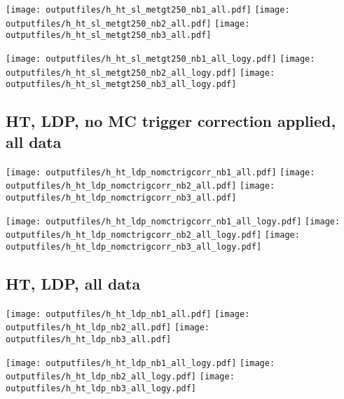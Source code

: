 \documentclass[11pt]{article}
\begin{document}
    \noindent
     \texttt{[image: outputfiles/h\_ht\_sl\_metgt250\_nb1\_all.pdf]}
     \texttt{[image: outputfiles/h\_ht\_sl\_metgt250\_nb2\_all.pdf]}
     \texttt{[image: outputfiles/h\_ht\_sl\_metgt250\_nb3\_all.pdf]}

    \noindent
     \texttt{[image: outputfiles/h\_ht\_sl\_metgt250\_nb1\_all\_logy.pdf]}
     \texttt{[image: outputfiles/h\_ht\_sl\_metgt250\_nb2\_all\_logy.pdf]}
     \texttt{[image: outputfiles/h\_ht\_sl\_metgt250\_nb3\_all\_logy.pdf]}











     \subsection{ HT, LDP, no MC trigger correction applied, all data}

    \noindent
     \texttt{[image: outputfiles/h\_ht\_ldp\_nomctrigcorr\_nb1\_all.pdf]}
     \texttt{[image: outputfiles/h\_ht\_ldp\_nomctrigcorr\_nb2\_all.pdf]}
     \texttt{[image: outputfiles/h\_ht\_ldp\_nomctrigcorr\_nb3\_all.pdf]}

    \noindent
     \texttt{[image: outputfiles/h\_ht\_ldp\_nomctrigcorr\_nb1\_all\_logy.pdf]}
     \texttt{[image: outputfiles/h\_ht\_ldp\_nomctrigcorr\_nb2\_all\_logy.pdf]}
     \texttt{[image: outputfiles/h\_ht\_ldp\_nomctrigcorr\_nb3\_all\_logy.pdf]}


    \subsection{ HT, LDP, all data}

    \noindent
     \texttt{[image: outputfiles/h\_ht\_ldp\_nb1\_all.pdf]}
     \texttt{[image: outputfiles/h\_ht\_ldp\_nb2\_all.pdf]}
     \texttt{[image: outputfiles/h\_ht\_ldp\_nb3\_all.pdf]}

    \noindent
     \texttt{[image: outputfiles/h\_ht\_ldp\_nb1\_all\_logy.pdf]}
     \texttt{[image: outputfiles/h\_ht\_ldp\_nb2\_all\_logy.pdf]}
     \texttt{[image: outputfiles/h\_ht\_ldp\_nb3\_all\_logy.pdf]}
\end{document}
